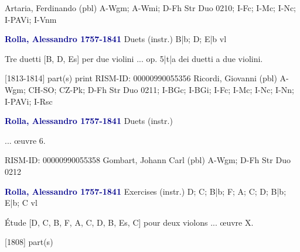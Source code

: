 \documentclass[twocolumn]{book}
\begin{document}
\newline Artaria, Ferdinando  (pbl)
\newline A-Wgm; A-Wmi; D-Fh  Str Duo 0210; I-Fc; I-Mc; I-Nc; I-PAVi; I-Vnm
\newline \par \vspace{7pt} \textcolor{darkblue}{\textbf{Rolla, Alessandro  1757-1841}}
\newline Duets (instr.)  B|b; D; E|b  
 vl
\newline \begin{itshape}Tre duetti [B, D, Es] per due violini ... op. 5|t|a dei duetti a due violini.\end{itshape} 
\newline \textcolor{darkblue}{}  [1813-1814]  part(s)  
\newline print
\newline RISM-ID: 00000990055356
\newline Ricordi, Giovanni  (pbl)
\newline A-Wgm; CH-SO; CZ-Pk; D-Fh  Str Duo 0211; I-BGc; I-BGi; I-Fc; I-Mc; I-Nc; I-Nn; I-PAVi; I-Rsc
\newline \par \vspace{7pt} \textcolor{darkblue}{\textbf{Rolla, Alessandro  1757-1841}}
\newline Duets (instr.)    
\newline \begin{itshape}... œuvre 6.\end{itshape} 
\newline RISM-ID: 00000990055358
\newline Gombart, Johann Carl  (pbl)
\newline A-Wgm; D-Fh  Str Duo 0212
\newline \par \vspace{7pt} \textcolor{darkblue}{\textbf{Rolla, Alessandro  1757-1841}}
\newline Exercises (instr.)  D; C; B|b; F; A; C; D; B|b; E|b; C  
 vl
\newline \begin{itshape}Étude [D, C, B, F, A, C, D, B, Es, C] pour deux violons ... œuvre X.\end{itshape} 
\newline \textcolor{darkblue}{}  [1808]  part(s)  
\end{document}
